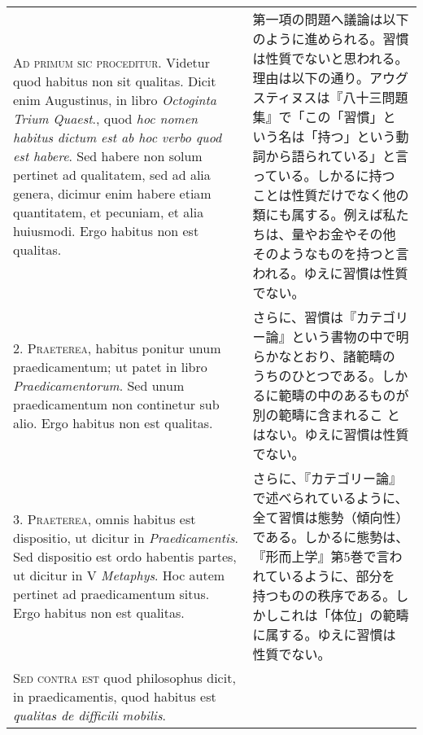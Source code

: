 \documentclass[10pt]{jsarticle} %
\begin{document}
\begin{longtable}{p{21em}p{21em}}

{\scshape Ad primum sic proceditur}. Videtur quod habitus non sit
qualitas. Dicit enim Augustinus, in libro {\itshape Octoginta Trium Quaest}.,
quod {\itshape hoc nomen habitus dictum est ab hoc verbo quod est habere}. Sed
habere non solum pertinet ad qualitatem, sed ad alia genera, dicimur
enim habere etiam quantitatem, et pecuniam, et alia huiusmodi. Ergo
habitus non est qualitas.

&

第一項の問題へ議論は以下のように進められる。習慣は性質でないと思われる。
理由は以下の通り。アウグスティヌスは『八十三問題集』で「この「習慣」と
いう名は「持つ」という動詞から語られている」と言っている。しかるに持つ
ことは性質だけでなく他の類にも属する。例えば私たちは、量やお金やその他
そのようなものを持つと言われる。ゆえに習慣は性質でない。

\\



2. {\scshape Praeterea}, habitus ponitur unum praedicamentum; ut patet in libro
{\itshape Praedicamentorum}. Sed unum praedicamentum non continetur sub
alio. Ergo habitus non est qualitas.

&

さらに、習慣は『カテゴリー論』という書物の中で明らかなとおり、諸範疇の
 うちのひとつである。しかるに範疇の中のあるものが別の範疇に含まれるこ
 とはない。ゆえに習慣は性質でない。

\\



3. {\scshape Praeterea}, omnis habitus est dispositio, ut dicitur in
{\itshape Praedicamentis}. Sed dispositio est ordo habentis partes, ut dicitur in
V {\itshape Metaphys}. Hoc autem pertinet ad praedicamentum situs. Ergo habitus
non est qualitas.

&

さらに、『カテゴリー論』で述べられているように、全て習慣は態勢（傾向性）
である。しかるに態勢は、『形而上学』第5巻で言われているように、部分を
持つものの秩序である。しかしこれは「体位」の範疇に属する。ゆえに習慣は
 性質でない。


\\



{\scshape Sed contra est} quod philosophus dicit, in praedicamentis, quod habitus
est {\itshape qualitas de difficili mobilis}.


\end{longtable}
\end{document}
